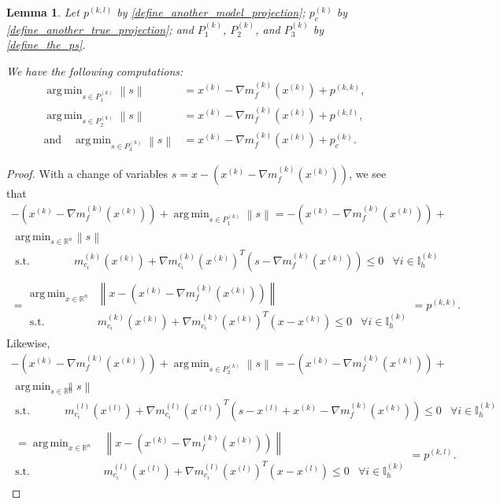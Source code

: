 \documentclass{article}
\newtheorem{lemma}[theorem]{Lemma}
\theoremstyle{case}
\numberwithin{theorem}{subsection}
\DeclareMathOperator*{\argmin}{arg\,min}
\newcommand{\gk}{{\nabla m_f^{(k)}\left(\xk\right)}}
\newcommand{\gmcik}{{\nabla m_{c_i}^{(k)}\left(\xk\right)}}
\newcommand{\gmcil}{{\nabla m_{c_i}^{(l)}\left(\xl\right)}}
\newcommand{\mcik}{{{m}^{(k)}_{c_i}}}
\newcommand{\mcil}{{{m}^{(l)}_{c_i}}}
\newcommand{\Rn}{\mathbb R^n}
\newcommand{\xk}{x^{(k)}}
\newcommand{\xl}{{x^{(l)}}}
\newcommand{\projkl}{{p^{(k,l)}}}
\newcommand{\projkk}{{p^{(k,k)}}}
\newcommand{\trueprojk}{{p_c^{(k)}}}
\newcommand{\activeindicesk}{{ \mathbb I_h^{(k)} }}
\begin{document}
\begin{lemma}
\label{bprojs_comps}
Let
$\projkl$ by \cref{define_another_model_projection};
$\trueprojk$ by \cref{define_another_true_projection};
and $P^{(k)}_1$, $P^{(k)}_2$, and $P^{(k)}_3$ by \cref{define_the_ps}.

We have the following computations:
\begin{align*}
\argmin_{s \in P^{(k)}_1} \left\|s\right\| &= \xk - \gk + \projkk, \\
\argmin_{s \in P^{(k)}_2} \left\|s\right\| &= \xk - \gk + \projkl, \\
\textrm{and} \quad \argmin_{s \in P^{(k)}_3} \left\|s\right\| &= \xk - \gk + \trueprojk.
\end{align*}
\end{lemma}
\begin{proof}
With a change of variables $s = x - \left(\xk - \gk \right)$, we see that
\begin{align*}
-\left(\xk - \gk\right) + \argmin_{s \in P^{(k)}_1} \left\|s\right\|
=
-\left(\xk - \gk\right) + \\ \begin{array}{ccc}
\argmin_{s \in \Rn} & \left\|s\right\| & \\
\textrm{s.t.} & \mcik \left(\xk\right) + \gmcik ^T\left(s - \gk\right) \le 0& \forall i \in \activeindicesk
\end{array} \\
= \begin{array}{ccc}
\argmin_{x \in \Rn} & \left\|x - \left(\xk - \gk\right)\right\| & \\
\textrm{s.t.} & \mcik \left(\xk\right) + \gmcik ^T\left(x - \xk\right) \le 0& \forall i \in \activeindicesk
\end{array}
= \projkk.
\end{align*}
Likewise,
\begin{align*}
-\left(\xk - \gk\right) + \argmin_{s \in P^{(k)}_2} \left\|s\right\|
= -\left(\xk - \gk\right) + \\
\begin{array}{ccc}
\argmin_{s \in \Rn} & \left\|s\right\| & \\
\textrm{s.t.} & \mcil \left(\xl\right) + \gmcil ^T\left(s - \xl + \xk - \gk\right) \le 0& \forall i \in \activeindicesk
\end{array} \\
\begin{array}{ccc}
= \argmin_{x \in \Rn} & \left\|x - \left(\xk - \gk\right)\right\| & \\
\textrm{s.t.} & \mcil \left(\xl\right) + \gmcil ^T\left(x - \xl\right) \le 0& \forall i \in \activeindicesk
\end{array}
= \projkl.
\end{align*}


\end{proof}
\end{document}
